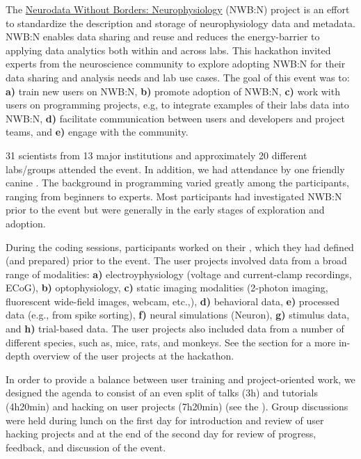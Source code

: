 \documentclass{article}
\begin{document}
The \href{https://neurodatawithoutborders.github.io}{Neurodata Without Borders: Neurophysiology} 
(NWB:N) project is an effort to standardize the description and storage of 
neurophysiology data and metadata. NWB:N enables data sharing and reuse and 
reduces the energy-barrier to applying data analytics both within and across 
labs. %
This hackathon invited 
experts from the neuroscience community to explore adopting NWB:N for their
data sharing and analysis needs and lab use cases. The goal of this event was to: 
\textbf{a)} train new users on NWB:N, \textbf{b)} promote adoption of NWB:N, 
\textbf{c)} work with users on programming projects, e.g, to integrate examples
of their labs data into NWB:N, \textbf{d)} facilitate communication between users 
and developers and project teams, and \textbf{e)} engage with the community.

31 scientists from 13 major institutions and approximately 20 different labs/groups 
attended the event.  In addition, we had attendance by one friendly canine \smiley{}.
The background in programming varied greatly among the participants, ranging from beginners 
to experts. Most participants had investigated NWB:N prior to the event but
were generally in the early stages of exploration and adoption. 

During the coding sessions, participants worked on their ,
which they had defined (and prepared) prior to the event. The user projects involved
data from a broad range of modalities:
\textbf{a)} electroyphysiology (voltage and current-clamp recordings,  ECoG),  
\textbf{b)} optophysiology,
\textbf{c)} static imaging modalities (2-photon imaging, fluorescent wide-field images, webcam, etc.,),
\textbf{d)} behavioral data,
\textbf{e)} processed data (e.g., from spike sorting),
\textbf{f)} neural simulations (Neuron),
\textbf{g)} stimulus data, and
\textbf{h)} trial-based data. The user projects also included data from a number of different 
species, such as, mice, rats, and monkeys.
See the  section for a more in-depth overview of the user projects
at the hackathon. 

In order to provide a balance between user training and project-oriented work, 
we designed the agenda to consist of an even split of talks (3h) and tutorials (4h20min) and hacking on user
projects (7h20min) (see the ). Group discussions were held during lunch on 
    the first day for introduction and review of user hacking projects and at the end of the second 
day for review of progress, feedback, and discussion of the event. 
\end{document}
